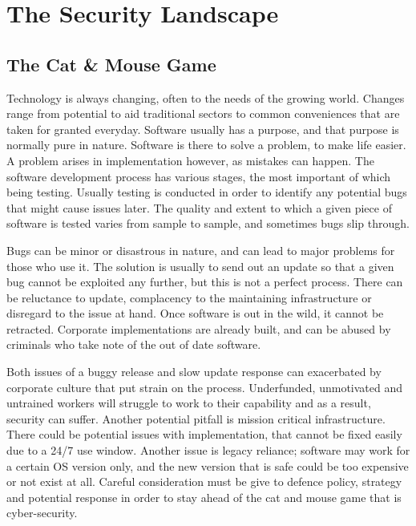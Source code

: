 




\chapter{The Security Landscape}
\section{The Cat \& Mouse Game}
Technology is always changing, often to the needs of the growing world. Changes range from potential to aid traditional sectors to common conveniences that are taken for granted everyday.
Software usually has a purpose, and that purpose is normally pure in nature. Software is there to solve a problem, to make life easier. A problem arises in implementation however, as mistakes can happen.
The software development process has various stages, the most important of which being testing. Usually testing is conducted in order to identify any potential bugs that might cause issues later.
The quality and extent to which a given piece of software is tested varies from sample to sample, and sometimes bugs slip through.

Bugs can be minor or disastrous in nature, and can lead to major problems for those who use it.
The solution is usually to send out an update so that a given bug cannot be exploited any further, but this is not a perfect process. There can be reluctance to update, complacency to the maintaining infrastructure or disregard to the issue at hand.
Once software is out in the wild, it cannot be retracted. Corporate implementations are already built, and can be abused by criminals who take note of the out of date software.

Both issues of a buggy release and slow update response can exacerbated by corporate culture that put strain on the process. Underfunded, unmotivated and untrained workers will struggle to work to their capability and as a result, security can suffer. 
Another potential pitfall is mission critical infrastructure. There could be potential issues with implementation, that cannot be fixed easily due to a 24/7 use window. Another issue is legacy reliance; software may work for a certain OS version only, 
and the new version that is safe could be too expensive or not exist at all. Careful consideration must be give to defence policy, strategy and potential response in order to stay ahead of the cat and mouse game that is cyber-security.


